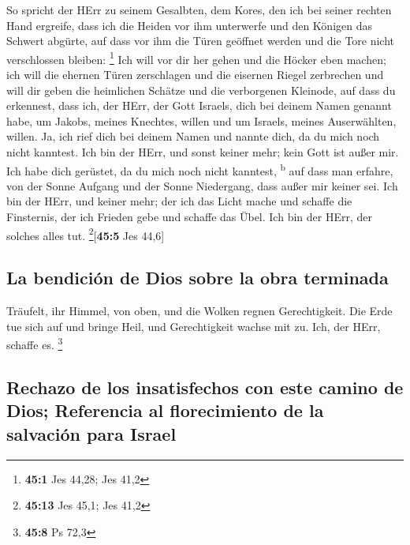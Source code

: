  So spricht der HErr zu seinem Gesalbten, dem Kores, den
ich bei seiner rechten Hand ergreife, dass ich die Heiden vor ihm
unterwerfe und den Königen das Schwert abgürte, auf dass vor ihm die
Türen geöffnet werden und die Tore nicht verschlossen bleiben:
\footnote{\textbf{45:1} Jes 44,28; Jes 41,2}  Ich will vor
dir her gehen und die Höcker eben machen; ich will die ehernen Türen
zerschlagen und die eisernen Riegel zerbrechen  und will
dir geben die heimlichen Schätze und die verborgenen Kleinode, auf dass
du erkennest, dass ich, der HErr, der Gott Israels, dich bei deinem
Namen genannt habe,  um Jakobs, meines Knechtes, willen
und um Israels, meines Auserwählten, willen. Ja, ich rief dich bei
deinem Namen und nannte dich, da du mich noch nicht kanntest.
 Ich bin der HErr, und sonst keiner mehr; kein Gott ist
außer mir. Ich habe dich gerüstet, da du mich noch nicht kanntest,
\textsuperscript{b}  auf dass man erfahre, von der Sonne
Aufgang und der Sonne Niedergang, dass außer mir keiner sei. Ich bin der
HErr, und keiner mehr;  der ich das Licht mache und
schaffe die Finsternis, der ich Frieden gebe und schaffe das Übel. Ich
bin der HErr, der solches alles tut. \footnote{\textbf{45:13} Jes 45,1;
  Jes 41,2}{[}\textbf{45:5} Jes 44,6{]}

\hypertarget{la-bendiciuxf3n-de-dios-sobre-la-obra-terminada}{%
\subsection{La bendición de Dios sobre la obra
terminada}\label{la-bendiciuxf3n-de-dios-sobre-la-obra-terminada}}

 Träufelt, ihr Himmel, von oben, und die Wolken regnen
Gerechtigkeit. Die Erde tue sich auf und bringe Heil, und Gerechtigkeit
wachse mit zu. Ich, der HErr, schaffe es. \footnote{\textbf{45:8} Ps
  72,3}

\hypertarget{rechazo-de-los-insatisfechos-con-este-camino-de-dios-referencia-al-florecimiento-de-la-salvaciuxf3n-para-israel}{%
\subsection{Rechazo de los insatisfechos con este camino de Dios;
Referencia al florecimiento de la salvación para
Israel}\label{rechazo-de-los-insatisfechos-con-este-camino-de-dios-referencia-al-florecimiento-de-la-salvaciuxf3n-para-israel}}

